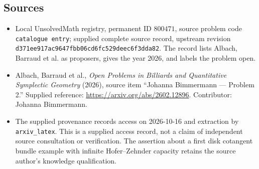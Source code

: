 \documentclass[11pt]{article}
\begin{document}
\subsection{Sources}
\begin{itemize}
\item Local UnsolvedMath registry, permanent ID \(800471\), source problem code \texttt{catalogue entry}; supplied complete source record, upstream revision \texttt{d371ee917ac9647fbb06cd6fc529deec6f3dda82}. The record lists Albach, Barraud et al. as proposers, gives the year 2026, and labels the problem open.
\item Albach, Barraud et al., \emph{Open Problems in Billiards and Quantitative Symplectic Geometry} (2026), source item ``Johanna Bimmermann --- Problem 2.'' Supplied reference: \url{https://arxiv.org/abs/2602.12896}. Contributor: Johanna Bimmermann.
\item The supplied provenance records access on 2026-10-16 and extraction by \texttt{arxiv\_latex}. This is a supplied access record, not a claim of independent source consultation or verification. The assertion about a first disk cotangent bundle example with infinite Hofer--Zehnder capacity retains the source author's knowledge qualification.
\end{itemize}
\end{document}
